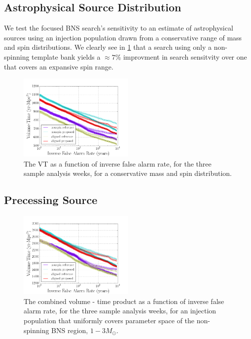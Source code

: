 \subsection{Astrophysical Source Distribution}

We test the focused BNS search's sensitivity to an estimate of astrophysical sources using an injection population drawn from a conservative range of mass and spin distributions. We clearly see in \ref{fig:rest} that a search using only a non-spinning template bank yields a $\approx{7\%}$ improvment in search sensitvity over one that covers an expansive spin range. 

\begin{figure}
\includegraphics[width=0.5\textwidth]{papers/bns_o1_dev/figures/rest_combined.png}
\caption{\label{fig:rest} 
The VT as a function of inverse false alarm rate, for the
three sample analysis weeks, for a conservative mass and spin distribution. }
\end{figure}

\subsection{Precessing Source}

\begin{figure}
\includegraphics[width=0.5\textwidth]{papers/bns_o1_dev/figures/prec_combined.png}
\caption{\label{fig:prec} 
The combined volume - time product as a function of inverse false alarm rate, for the
three sample analysis weeks, for an injection population that uniformly covers parameter space of the non-spinning BNS region, $1- 3M_\odot$. 
}
\end{figure}

